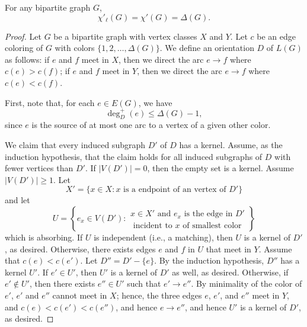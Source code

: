 \begin{theorem} \label{thm:galvin}
    For any bipartite graph \(G\),
    \begin{equation}
        \chi'_\ell(G) = \chi'(G) = \Delta(G).
    \end{equation}
\end{theorem}

\begin{proof}
    Let \(G\) be a bipartite graph with vertex classes \(X\) and \(Y\).
    Let \(c\) be an edge coloring of \(G\) with colors \(\{1, 2, \ldots, \Delta(G)\}\).
    We define an orientation \(D\) of \(L(G)\) as follows:
    if \(e\) and \(f\) meet in \(X\),
    then we direct the arc \(e \to f\) where \(c(e) > c(f)\);
    if \(e\) and \(f\) meet in \(Y\),
    then we direct the arc \(e \to f\) where \(c(e) < c(f)\).

    First, note that, for each \(e \in E(G)\),
    we have
    \begin{equation}
        \deg^+_D(e) \leq \Delta(G) - 1,
    \end{equation}
    since \(e\) is the source of at most one arc to a vertex of a given other color.

    We claim that every induced subgraph \(D'\) of \(D\) has a kernel.
    Assume, as the induction hypothesis,
    that the claim holds for all induced subgraphs of \(D\)
    with fewer vertices than \(D'\).
    If \(|V(D')| = 0\), then the empty set is a kernel.
    Assume \(|V(D')| \geq 1\).
    Let
    \begin{equation}
        X' = \{x \in X : x \text{ is a endpoint of an vertex of } D'\}
    \end{equation}
    and let
    \begin{equation}
        U = \left\{
            e_x \in V(D')
            :
            \begin{array}{c}
                x \in X' \text{ and }
                e_x \text{ is the edge in } D' \\
                \text{ incident to } x \text{ of smallest color}
            \end{array}
        \right\}
    \end{equation}
    which is absorbing.
    If \(U\) is independent (i.e., a matching), then \(U\) is a kernel of \(D'\), as desired.
    Otherwise, there exists edges \(e\) and \(f\) in \(U\) that meet in \(Y\).
    Assume that \(c(e) < c(e')\).
    Let \(D'' = D' - \{e\}\).
    By the induction hypothesis, \(D''\) has a kernel \(U'\).
    If \(e' \in U'\), then \(U'\) is a kernel of \(D'\) as well, as desired.
    Otherwise, if \(e' \notin U'\),
    then there exists \(e'' \in U'\) such that \(e' \to e''\).
    By minimality of the color of \(e'\), \(e'\) and \(e''\) cannot meet in \(X\);
    hence, the three edges \(e\), \(e'\), and \(e''\) meet in \(Y\), and \(c(e) < c(e') < c(e'')\), and hence \(e \to e''\), and hence \(U'\) is a kernel of \(D'\), as desired.
\end{proof}

